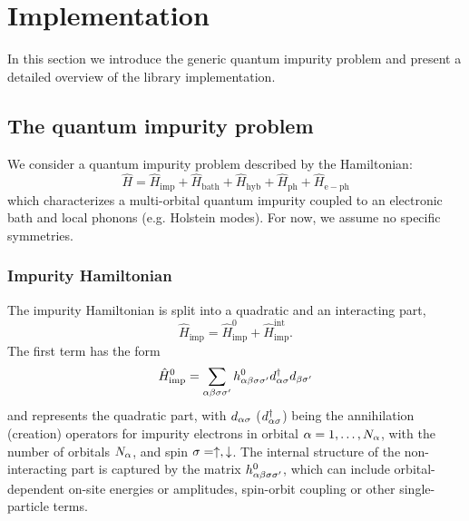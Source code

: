 \documentclass[edipack_sp.tex]{subfiles}
\begin{document}
\section{Implementation}\label{SecEDIpack}
In this section we introduce the generic quantum impurity problem and
present a detailed overview of the \NAME library implementation. 













\subsection{The quantum impurity problem}\label{sSecQIM}
We consider a quantum impurity problem described by the Hamiltonian:
$$
\hat{H} = \hat{H}_\mathrm{imp} + \hat{H}_\mathrm{bath} + \hat{H}_\mathrm{hyb} + \hat{H}_\mathrm{ph} + \hat{H}_\mathrm{e-ph}
$$
which characterizes a multi-orbital quantum impurity
coupled to an electronic bath and local phonons (e.g. Holstein
modes). For now, we assume no specific symmetries.

\subsubsection{Impurity Hamiltonian}
The impurity Hamiltonian is split into a quadratic and an 
interacting part,
\begin{equation}\label{Himp}
  \hat{H}_\mathrm{imp}  = \hat{H}^0_\mathrm{imp} + \hat{H}^\mathrm{int}_\mathrm{imp}.
\end{equation}
The first term has the form
\begin{equation}\label{H0imp}
  \hat{H}^0_\mathrm{imp}  =
  \sum_{\alpha\beta\sigma\sigma'}h^{0}_{\alpha\beta\sigma\sigma'}d^\dagger_{\alpha\sigma}d_{\beta\sigma'}
\end{equation}
and represents the quadratic part, with $d_{\alpha\sigma}$ ($d^\dagger_{\alpha\sigma}$) being the annihilation (creation)
operators for impurity electrons in 
orbital $\alpha=1,\dots,N_\alpha$, with the number of orbitals $N_\alpha$,
and spin $\sigma=\uparrow,\downarrow$.
The internal structure of the non-interacting part is captured by the 
matrix $h^{0}_{\alpha\beta\sigma\sigma'}$, which can include 
orbital-dependent on-site energies or amplitudes, spin-orbit coupling or other single-particle terms.
\end{document}
